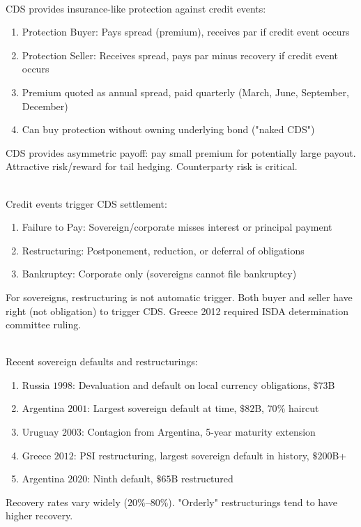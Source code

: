 \documentclass[a4paper,oneside,openany]{book}
\begin{document}
\begin{remark} \\
CDS provides insurance-like protection against credit events:
\begin{enumerate}[label=\roman*.]
\setlength{\itemsep}{0pt}
\item Protection Buyer: Pays spread (premium), receives par if credit event occurs
\item Protection Seller: Receives spread, pays par minus recovery if credit event occurs
\item Premium quoted as annual spread, paid quarterly (March, June, September, December)
\item Can buy protection without owning underlying bond ("naked CDS")
\end{enumerate}
CDS provides asymmetric payoff: pay small premium for potentially large payout. Attractive risk/reward for tail hedging. Counterparty risk is critical.
\end{remark}

\begin{remark} \\
Credit events trigger CDS settlement:
\begin{enumerate}[label=\roman*.]
\setlength{\itemsep}{0pt}
\item Failure to Pay: Sovereign/corporate misses interest or principal payment
\item Restructuring: Postponement, reduction, or deferral of obligations
\item Bankruptcy: Corporate only (sovereigns cannot file bankruptcy)
\end{enumerate}
For sovereigns, restructuring is not automatic trigger. Both buyer and seller have right (not obligation) to trigger CDS. Greece 2012 required ISDA determination committee ruling.
\end{remark}

\begin{remark} \\
Recent sovereign defaults and restructurings:
\begin{enumerate}[label=\roman*.]
\setlength{\itemsep}{0pt}
\item Russia $1998$: Devaluation and default on local currency obligations, $\$73$B
\item Argentina $2001$: Largest sovereign default at time, $\$82$B, $70\%$ haircut
\item Uruguay $2003$: Contagion from Argentina, 5-year maturity extension
\item Greece $2012$: PSI restructuring, largest sovereign default in history, $\$200$B+
\item Argentina $2020$: Ninth default, $\$65$B restructured
\end{enumerate}
Recovery rates vary widely ($20\%$--$80\%$). "Orderly" restructurings tend to have higher recovery.
\end{remark}
\end{document}
